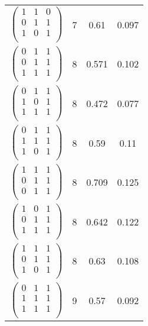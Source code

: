 \documentclass{amsart}
\theoremstyle{definition}
\theoremstyle{remark}
\numberwithin{equation}{section}
\begin{document}
\begin{longtable}{ c || c | c | c }
$\begin{pmatrix}
1 & 1 & 0\\
0 & 1 & 1\\
1 & 0 & 1\\
\end{pmatrix}$ & 7 & 0.61 & 0.097\\
$\begin{pmatrix}
0 & 1 & 1\\
0 & 1 & 1\\
1 & 1 & 1\\
\end{pmatrix}$ & 8 & 0.571 & 0.102\\
$\begin{pmatrix}
0 & 1 & 1\\
1 & 0 & 1\\
1 & 1 & 1\\
\end{pmatrix}$ & 8 & 0.472 & 0.077\\
$\begin{pmatrix}
0 & 1 & 1\\
1 & 1 & 1\\
1 & 0 & 1\\
\end{pmatrix}$ & 8 & 0.59 & 0.11\\
$\begin{pmatrix}
1 & 1 & 1\\
0 & 1 & 1\\
0 & 1 & 1\\
\end{pmatrix}$ & 8 & 0.709 & 0.125\\
$\begin{pmatrix}
1 & 0 & 1\\
0 & 1 & 1\\
1 & 1 & 1\\
\end{pmatrix}$ & 8 & 0.642 & 0.122\\
$\begin{pmatrix}
1 & 1 & 1\\
0 & 1 & 1\\
1 & 0 & 1\\
\end{pmatrix}$ & 8 & 0.63 & 0.108\\
$\begin{pmatrix}
0 & 1 & 1\\
1 & 1 & 1\\
1 & 1 & 1\\
\end{pmatrix}$ & 9 & 0.57 & 0.092\\

\end{longtable}
\end{document}
